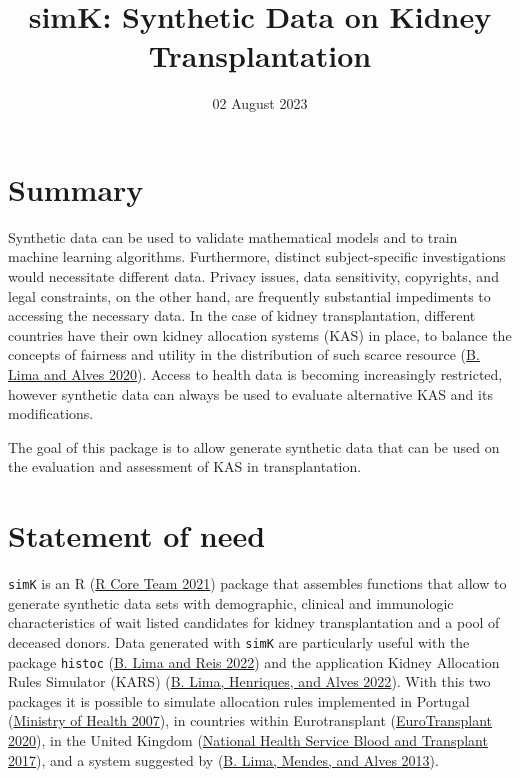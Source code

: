 \documentclass[
]{article}
\title{simK: Synthetic Data on Kidney Transplantation}
\author{}
\date{\vspace{-2.5em}02 August 2023}
\begin{document}
\maketitle

\hypertarget{summary}{%
\section{Summary}\label{summary}}

Synthetic data can be used to validate mathematical models and to train
machine learning algorithms. Furthermore, distinct subject-specific
investigations would necessitate different data. Privacy issues, data
sensitivity, copyrights, and legal constraints, on the other hand, are
frequently substantial impediments to accessing the necessary data. In
the case of kidney transplantation, different countries have their own
kidney allocation systems (KAS) in place, to balance the concepts of
fairness and utility in the distribution of such scarce resource
(\protect\hyperlink{ref-Lima:2020}{B. Lima and Alves 2020}). Access to
health data is becoming increasingly restricted, however synthetic data
can always be used to evaluate alternative KAS and its modifications.

The goal of this package is to allow generate synthetic data that can be
used on the evaluation and assessment of KAS in transplantation.

\hypertarget{statement-of-need}{%
\section{Statement of need}\label{statement-of-need}}

\texttt{simK} is an R (\protect\hyperlink{ref-R}{R Core Team 2021})
package that assembles functions that allow to generate synthetic data
sets with demographic, clinical and immunologic characteristics of wait
listed candidates for kidney transplantation and a pool of deceased
donors. Data generated with \texttt{simK} are particularly useful with
the package \texttt{histoc} (\protect\hyperlink{ref-Lima:2022a}{B. Lima
and Reis 2022}) and the application Kidney Allocation Rules Simulator
(KARS) (\protect\hyperlink{ref-Lima:2022b}{B. Lima, Henriques, and Alves
2022}). With this two packages it is possible to simulate allocation
rules implemented in Portugal (\protect\hyperlink{ref-PT}{Ministry of
Health 2007}), in countries within Eurotransplant
(\protect\hyperlink{ref-ET}{EuroTransplant 2020}), in the United Kingdom
(\protect\hyperlink{ref-UK}{National Health Service Blood and Transplant
2017}), and a system suggested by (\protect\hyperlink{ref-Lima:2013b}{B.
Lima, Mendes, and Alves 2013}).
\end{document}
